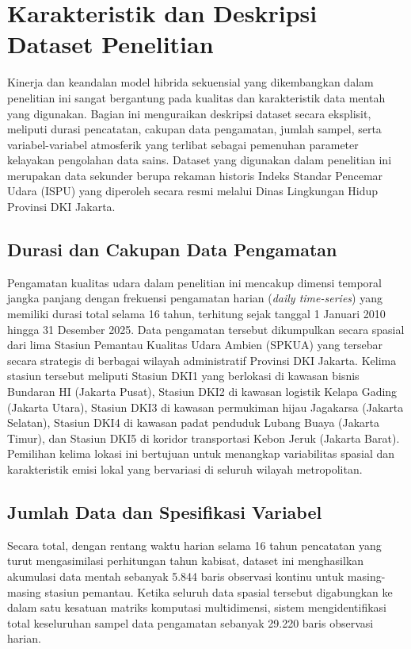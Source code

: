 \section{Karakteristik dan Deskripsi Dataset Penelitian}

Kinerja dan keandalan model hibrida sekuensial yang dikembangkan dalam penelitian ini sangat bergantung pada kualitas dan karakteristik data mentah yang digunakan. Bagian ini menguraikan deskripsi dataset secara eksplisit, meliputi durasi pencatatan, cakupan data pengamatan, jumlah sampel, serta variabel-variabel atmosferik yang terlibat sebagai pemenuhan parameter kelayakan pengolahan data sains. Dataset yang digunakan dalam penelitian ini merupakan data sekunder berupa rekaman historis Indeks Standar Pencemar Udara (ISPU) yang diperoleh secara resmi melalui Dinas Lingkungan Hidup Provinsi DKI Jakarta.

\subsection{Durasi dan Cakupan Data Pengamatan}

Pengamatan kualitas udara dalam penelitian ini mencakup dimensi temporal jangka panjang dengan frekuensi pengamatan harian (\textit{daily time-series}) yang memiliki durasi total selama 16 tahun, terhitung sejak tanggal 1 Januari 2010 hingga 31 Desember 2025. Data pengamatan tersebut dikumpulkan secara spasial dari lima Stasiun Pemantau Kualitas Udara Ambien (SPKUA) yang tersebar secara strategis di berbagai wilayah administratif Provinsi DKI Jakarta. Kelima stasiun tersebut meliputi Stasiun DKI1 yang berlokasi di kawasan bisnis Bundaran HI (Jakarta Pusat), Stasiun DKI2 di kawasan logistik Kelapa Gading (Jakarta Utara), Stasiun DKI3 di kawasan permukiman hijau Jagakarsa (Jakarta Selatan), Stasiun DKI4 di kawasan padat penduduk Lubang Buaya (Jakarta Timur), dan Stasiun DKI5 di koridor transportasi Kebon Jeruk (Jakarta Barat). Pemilihan kelima lokasi ini bertujuan untuk menangkap variabilitas spasial dan karakteristik emisi lokal yang bervariasi di seluruh wilayah metropolitan.

\subsection{Jumlah Data dan Spesifikasi Variabel}

Secara total, dengan rentang waktu harian selama 16 tahun pencatatan yang turut mengasimilasi perhitungan tahun kabisat, dataset ini menghasilkan akumulasi data mentah sebanyak 5.844 baris observasi kontinu untuk masing-masing stasiun pemantau. Ketika seluruh data spasial tersebut digabungkan ke dalam satu kesatuan matriks komputasi multidimensi, sistem mengidentifikasi total keseluruhan sampel data pengamatan sebanyak 29.220 baris observasi harian. 

